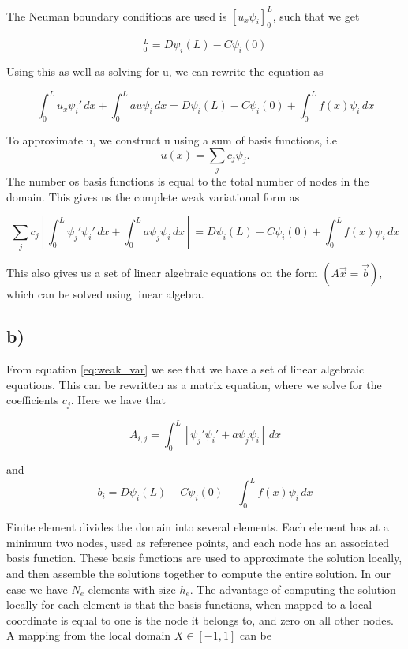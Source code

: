 \documentclass[norsk,a4paper,12pt]{scrartcl}
\begin{document}
The Neuman boundary conditions are used is $[u_x\psi_i]_0^L$, such that we get 

\begin{equation*}
    [u_x\psi_i]_0^L = D\psi_i(L) - C\psi_i(0)
\end{equation*}

Using this as well as solving for u, we can rewrite the equation as

\begin{equation}
    \int_0^L u_x\psi_i'\,dx  + \int_0^L au \psi_i \,dx= D\psi_i(L) - C\psi_i(0)  + \int_0^L f(x) \psi_i\, dx
\end{equation}

To approximate u, we construct u using a sum of basis functions, i.e 
\begin{equation}
    u(x) = \sum_j c_j \psi_j.
\end{equation}
The number os basis functions is equal to the total number of nodes in the domain. This gives us the complete weak variational form as 

\begin{equation}\label{eq:weak_var}
   \sum_j c_j \left[ \int_0^L \psi_j'\psi_i'\,dx  + \int_0^L a\psi_j \psi_i \,dx \right]= D\psi_i(L) - C\psi_i(0)  + \int_0^L f(x) \psi_i\, dx
\end{equation}

This also gives us a set of linear algebraic equations on the form $(A\Vec{x} = \Vec{b})$, which can be solved using linear algebra. 

\subsection{b)}
From equation \ref{eq:weak_var} we see that we have a set of linear algebraic equations. This can be rewritten as a matrix equation, where we solve for the coefficients $c_j$. Here we have that 

\begin{equation} \label{eq:mat_A_blob}
    A_{i,j} = \int_0^L \left[\psi_j'\psi_i'  + a\psi_j \psi_i \right]\,dx
\end{equation}

and 
\begin{equation}\label{eq:b_vec}
    b_i = D\psi_i(L) - C\psi_i(0)  + \int_0^L f(x) \psi_i\, dx
\end{equation}


Finite element divides the domain into several elements. Each element has at a minimum two nodes, used as reference points, and each node has an associated basis function. These basis functions are used to approximate the solution locally, and then assemble the solutions together to compute the entire solution. In our case we have $N_e$ elements with size $h_e$. The advantage of computing the solution locally for each element is that the basis functions, when mapped to a local coordinate is equal to one is the node it belongs to, and zero on all other nodes. A mapping from the local domain $X \in [-1, 1]$ can be 
\end{document}
